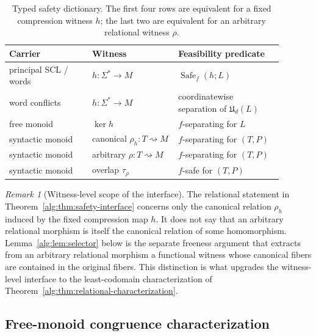 \documentclass[10pt,a4paper]{article}
\theoremstyle{definition}
\theoremstyle{remark}
\newtheorem{remark}[theorem]{Remark}
\newcommand{\relto}{\mathrel{\rightsquigarrow}}
\begin{document}
\begin{table}[t]
\centering
\caption{Typed safety dictionary.  The first four rows are equivalent for a
fixed compression witness \(h\); the last two are equivalent for an arbitrary
relational witness \(\rho\).}
\label{tab:typed-safety-dictionary}
\small
\begin{tabular}{@{}>{\raggedright\arraybackslash}p{0.27\linewidth}
                  >{\raggedright\arraybackslash}p{0.28\linewidth}
                  >{\raggedright\arraybackslash}p{0.34\linewidth}@{}}
\toprule
\textbf{Carrier} & \textbf{Witness} & \textbf{Feasibility predicate}\\
\midrule
principal SCL / words & \(h:\Sigma^*\to M\) & \(\operatorname{Safe}_f(h;L)\)\\
word conflicts & \(h:\Sigma^*\to M\) & coordinatewise separation of \(\mathfrak U_d(L)\)\\
free monoid & \(\ker h\) & \(f\)-separating for \(L\)\\
syntactic monoid & canonical \(\rho_h:T\relto M\) & \(f\)-separating for \((T,P)\)\\
\midrule
syntactic monoid & arbitrary \(\rho:T\relto M\) & \(f\)-separating for \((T,P)\)\\
syntactic monoid & overlap \(\tau_\rho\) & \(f\)-safe for \((T,P)\)\\
\bottomrule
\end{tabular}
\end{table}

\begin{remark}[Witness-level scope of the interface]
\label{alg:rem:witness-scope}
The relational statement in Theorem~\ref{alg:thm:safety-interface} concerns
only the canonical relation \(\rho_h\) induced by the fixed compression map
\(h\).  It does not say that an arbitrary relational morphism is itself the
canonical relation of some homomorphism.  Lemma~\ref{alg:lem:selector} below
is the separate freeness argument that extracts from an arbitrary relational
morphism a functional witness whose canonical fibers are contained in the
original fibers.  This distinction is what upgrades the witness-level
interface to the least-codomain characterization of
Theorem~\ref{alg:thm:relational-characterization}.
\end{remark}

\subsection{Free-monoid congruence characterization}
\end{document}
